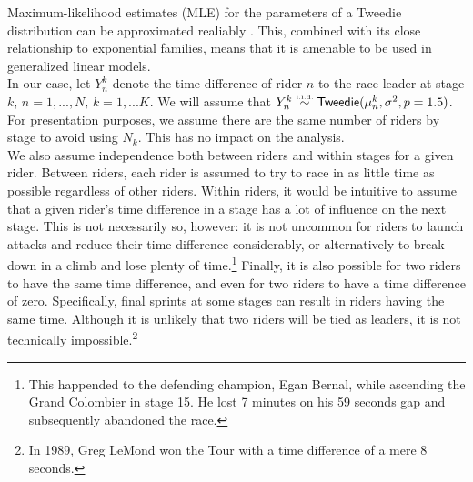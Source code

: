 \documentclass[aos,preprint]{imsart}
\begin{document}
Maximum-likelihood estimates (MLE) for the parameters of a Tweedie distribution can be approximated realiably \citep{ozturk1981, withers2011}. This, combined with its close relationship to exponential families, means that it is amenable to be used in generalized linear models. \\

In our case, let $Y_n^k$ denote the time difference of rider $n$ to the race leader at stage $k$, $n=1, ..., N, \, k = 1, ...K$. We will assume that $Y_n^k \distiid \distNamed{Tweedie}(\mu_n^k, \sigma^2, p = 1.5)$. For presentation purposes, we assume there are the same number of riders by stage to avoid using $N_k$. This has no impact on the analysis. \\

We also assume independence both between riders and within stages for a given rider. Between riders, each rider is assumed to try to race in as little time as possible regardless of other riders. Within riders, it would be intuitive to assume that a given rider's time difference in a stage has a lot of influence on the next stage. This is not necessarily so, however: it is not uncommon for riders to launch attacks and reduce their time difference considerably, or alternatively to break down in a climb and lose plenty of time.\footnote{This happended to the defending champion, Egan Bernal, while ascending the Grand Colombier in stage 15. He lost 7 minutes on his 59 seconds gap and subsequently abandoned the race.} Finally, it is also possible for two riders to have the same time difference, and even for two riders to have a time difference of zero. Specifically, final sprints at some stages can result in riders having the same time. Although it is unlikely that two riders will be tied as leaders, it is not technically impossible.\footnote{In 1989, Greg LeMond won the Tour with a time difference of a mere 8 seconds.} \\
\end{document}
